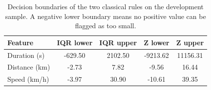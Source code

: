 \begin{table}[!t]
\caption{Decision boundaries of the two classical rules on the development sample. A negative lower boundary means no positive value can be flagged as too small.}
\label{tab:ext_fences}
\centering
\setlength{\tabcolsep}{3pt}
\footnotesize
\begin{tabular}{lcccc}
\hline
Feature & IQR lower & IQR upper & Z lower & Z upper \\
\hline
Duration (s) & -629.50 & 2102.50 & -9213.62 & 11156.31 \\
Distance (km) & -2.73 & 7.82 & -9.56 & 16.44 \\
Speed (km/h) & -3.97 & 30.90 & -10.61 & 39.35 \\
\hline
\end{tabular}
\end{table}